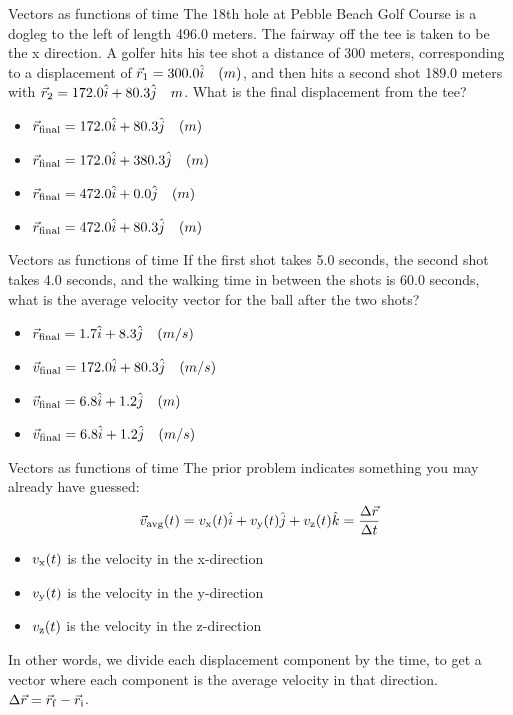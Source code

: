 \documentclass{beamer}
\begin{document}
\begin{frame}{Vectors as functions of time}
\small
The 18th hole at Pebble Beach Golf Course is a dogleg to the left of length 496.0 meters.  The fairway off the tee is taken to be the x direction.  A golfer hits his tee shot a distance of 300 meters, corresponding to a displacement of $\vec{r}_{\rm 1} = 300.0 \hat{i} \quad (m)$, and then hits a second shot 189.0 meters with $\vec{r}_{\rm 2} = 172.0 \hat{i} + 80.3 \hat{j} \quad m$.  What is the final displacement from the tee?
\begin{itemize}
\item $\vec{r}_{\rm final} = 172.0 \hat{i} + 80.3\hat{j}\quad (m)$
\item $\vec{r}_{\rm final} = 172.0 \hat{i} + 380.3\hat{j}\quad (m)$
\item $\vec{r}_{\rm final} = 472.0 \hat{i} + 0.0\hat{j}\quad (m)$
\item $\vec{r}_{\rm final} = 472.0 \hat{i} + 80.3\hat{j}\quad (m)$
\end{itemize}
\end{frame}

\begin{frame}{Vectors as functions of time}
\small
If the first shot takes 5.0 seconds, the second shot takes 4.0 seconds, and the walking time in between the shots is 60.0 seconds, what is the average velocity vector for the ball after the two shots?
\begin{itemize}
\item $\vec{r}_{\rm final} = 1.7 \hat{i} + 8.3\hat{j}\quad (m/s)$
\item $\vec{v}_{\rm final} = 172.0 \hat{i} + 80.3\hat{j}\quad (m/s)$
\item $\vec{v}_{\rm final} = 6.8 \hat{i} + 1.2\hat{j}\quad (m)$
\item $\vec{v}_{\rm final} = 6.8 \hat{i} + 1.2\hat{j}\quad (m/s)$
\end{itemize}
\end{frame}

\begin{frame}{Vectors as functions of time}
The prior problem indicates something you may already have guessed:
\begin{equation}
\vec{v}_{\rm avg}(t) = v_{\rm x}(t) \hat{i} + v_{\rm y}(t) \hat{j} + v_{\rm z}(t) \hat{k} = \frac{\Delta\vec{r}}{\Delta t}
\end{equation}
\begin{itemize}
\item $v_{\rm x}(t)$ is the velocity in the x-direction
\item $v_{\rm y}(t)$ is the velocity in the y-direction
\item $v_{\rm z}(t)$ is the velocity in the z-direction
\end{itemize}
In other words, we divide each displacement component by the time, to get a vector where each component is the average velocity in that direction.  $\Delta\vec{r} = \vec{r}_{\rm f} - \vec{r}_{\rm i}$.
\end{frame}
\end{document}
